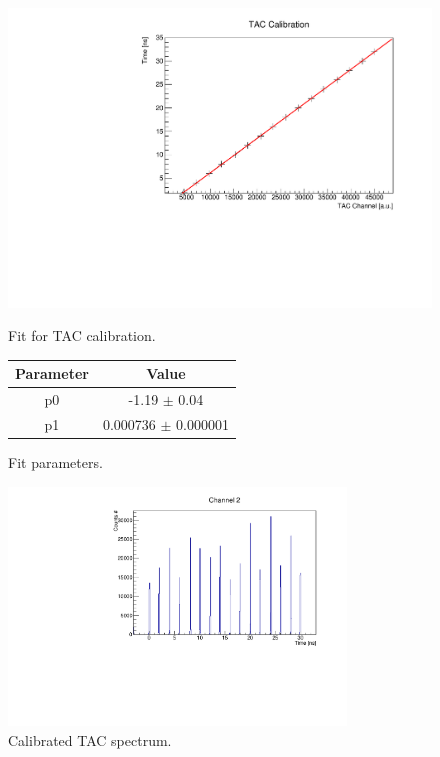 \documentclass[a4paper,11pt]{article}
\begin{document}
\begin{figure}[h!]
\begin{minipage}[b]{0.6\textwidth}
\centering
\includegraphics[width=\textwidth]{fit_calibrazione_tac}
\caption{Fit for TAC calibration.}
\label{fig: fit tac}
\end{minipage}
\hfill
\begin{minipage}[b]{0.45\textwidth}
\centering
\begin{tabular}{cc}
\toprule
\toprule
Parameter & Value \\
\midrule
p0     & -1.19 $\pm$  0.04 \\
p1     &  0.000736   $\pm$  0.000001\\
\bottomrule
\bottomrule
\end{tabular}
\vspace{1.5cm}
\caption{Fit parameters.}
\end{minipage}

\end{figure}

\begin{figure}[h!]
\centering
\includegraphics[width=0.8\textwidth]{tac_calibrato}
\caption{Calibrated TAC spectrum. }
\label{fig: calibrated TAC}
\end{figure}
\clearpage
\end{document}
